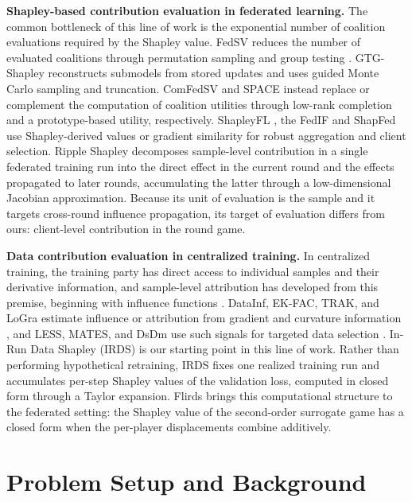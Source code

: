 \documentclass[letterpaper]{article} %
\theoremstyle{definition} %
\begin{document}
\textbf{Shapley-based contribution evaluation in federated learning.}
The common bottleneck of this line of work is the exponential number of
coalition evaluations required by the Shapley value. 
FedSV \citep{wang2020principled} reduces the number of evaluated coalitions through
permutation sampling and group testing
\citep{castro2009polynomial,jia2019towards}. GTG-Shapley
\citep{liu2022gtg} reconstructs submodels from stored updates and uses guided
Monte Carlo sampling and truncation. ComFedSV \citep{fan2022improving} and
SPACE \citep{chen2023space} instead replace or complement the computation of
coalition utilities through low-rank completion and a prototype-based utility,
respectively. ShapleyFL \citep{sun2023shapleyfl}, the FedIF \citep{tang2025lightweight} and ShapFed \citep{tastan2024redefining} use
Shapley-derived values or gradient similarity for robust aggregation and
client selection. Ripple
Shapley \citep{zeng2026ripple} decomposes sample-level contribution in a
single federated training run into the direct effect in the current round and
the effects propagated to later rounds, accumulating the latter through a
low-dimensional Jacobian approximation. Because its unit of evaluation is the
sample and it targets cross-round influence propagation, its target of
evaluation differs from ours: client-level contribution in the round
game.

\noindent\textbf{Data contribution evaluation in centralized training.}
In centralized training, the training party has direct access to individual
samples and their derivative information, and sample-level attribution has
developed from this premise, beginning with influence functions
\citep{koh2017understanding}. DataInf, EK-FAC, TRAK, and LoGra estimate
influence or attribution from gradient and curvature information
\citep{kwon2024datainf,grosse2023studying,park2023trak,choe2026your}, and
LESS, MATES, and DsDm use such signals for targeted data selection
\citep{xia2024less,yu2024mates,engstrom2024dsdm}. In-Run Data Shapley (IRDS)
\citep{wang2025data} is our starting point in this line of work. Rather than
performing hypothetical retraining, IRDS fixes one realized training run and
accumulates per-step Shapley values of the validation loss, computed in closed
form through a Taylor expansion. Flirds brings this computational structure to
the federated setting: the Shapley value of the second-order surrogate game has
a closed form when the per-player displacements combine additively.

\section{Problem Setup and Background}
\label{sec:background}
\end{document}
